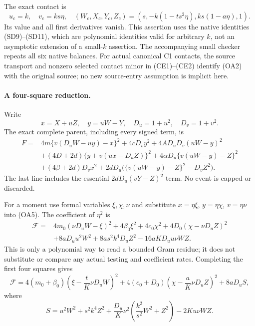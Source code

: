 The exact contact is
\[
 u_c=k,\quad v_c=ks\eta,\quad
 (W_c,X_c,Y_c,Z_c)=(s,-k(1-ts^2\eta),ks(1-a\eta),1).
                                                        \tag{OA4}
\]
Its value and all first derivatives vanish. This assertion uses the
native identities (SD9)--(SD11), which are polynomial identities valid
for arbitrary $k$, not an asymptotic extension of a small-$k$ assertion.
The accompanying small checker repeats all six native balances.
For actual canonical C1 contacts, the source transport and nonzero
selected contact minor in (CE1)--(CE2) identify (OA2) with the original
source; no new source-entry assumption is implicit here.

\paragraph{A four-square reduction.}
Write
\[
 x=X+uZ,\quad y=uW-Y,\quad D_u=1+u^2,\quad D_v=1+v^2.
\]
The exact complete parent, including every signed term, is
\begin{align*}
 F={}&4m\{v(D_uW-uy)-x\}^2+4cD_vy^2
       +4AD_uD_v(uW-y)^2\\
 &+(4D+2d)\{y+v(ux-D_uZ)\}^2
       +4\alpha D_u\{v(uW-y)-Z\}^2\\
 &+(4\beta+2d)D_vx^2
       +2dD_u\bigl(\{v(uW-y)-Z\}^2-D_vZ^2\bigr).
                                                        \tag{OA5}
\end{align*}
The last line includes the essential $2dD_u(vY-Z)^2$ term.
No event is capped or discarded.

For a moment use formal variables $\xi,\chi,\nu$ and substitute
$x=\eta\xi$, $y=\eta\chi$, $v=\eta\nu$ into (OA5).
The coefficient of $\eta^2$ is
\begin{align*}
 \mathcal F={}&4m_0(\nu D_uW-\xi)^2+4\beta_0\xi^2
       +4c_0\chi^2+4D_0(\chi-\nu D_uZ)^2\\
 &+8aD_uu^2W^2+8as^2k^4D_uZ^2
       -16aKD_uu\nu WZ.
                                                        \tag{OA6}
\end{align*}
This is only a polynomial way to read a bounded Gram residue; it does
not substitute or compare any actual testing and coefficient rates.
Completing the first four squares gives
\[
 \mathcal F=4(m_0+\beta_0)
  \left(\xi-\frac tK\nu D_uW\right)^2
 +4(c_0+D_0)\left(\chi-\frac aK\nu D_uZ\right)^2
 +8aD_uS,                                               \tag{OA7}
\]
where
\[
 S=u^2W^2+s^2k^4Z^2+
   \frac{D_u}{K}\nu^2\left(\frac{k^2}{s^2}W^2+Z^2\right)
   -2Ku\nu WZ.                                         \tag{OA8}
\]

